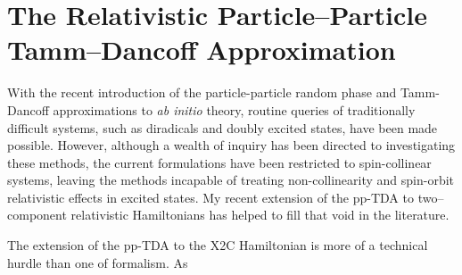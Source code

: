 \linespread{1.0}
\section{The Relativistic Particle--Particle Tamm--Dancoff Approximation}
\linespread{1.5}
\label{sec:pp-X2C}

With the recent introduction of the particle-particle random phase and
Tamm-Dancoff approximations to \emph{ab initio} theory, routine queries of
traditionally difficult systems, such as diradicals and doubly excited states,
have been made possible. However, although a wealth of inquiry has been directed
to investigating these methods, the current formulations have been restricted to
spin-collinear systems, leaving the methods incapable of treating
non-collinearity and spin-orbit relativistic effects in excited states.  My
recent extension of the pp-TDA to two--component relativistic
Hamiltonians\cite{DBWY16_Accepted1} has helped to fill that void in the
literature.

The extension of the pp-TDA to the X2C Hamiltonian is more of a technical hurdle
than one of formalism. As
